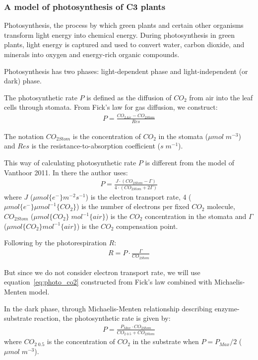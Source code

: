 \documentclass[a4paper]{article}
\begin{document}
\subsubsection{A model of photosynthesis of C3 plants}\label{sssec:photo_c3}
Photosynthesis, the process by which green plants and certain other organisms transform light energy into chemical energy. During photosynthesis in green plants, light energy is captured and used to convert water, carbon dioxide, and minerals into oxygen and energy-rich organic compounds.

Photosynthesis has two phases: light-dependent phase and light-independent (or dark) phase.

The photosynthetic rate \(P\) is defined as the diffusion of \(CO_2\) from air into the leaf cells through stomata. From Fick's law for gas diffusion, we construct:
\begin{align}
  \label{eq:photo_co2}
  P = \frac{CO_{2Air} - CO_{2Stom}}{Res}
\end{align}

The notation \(CO_{2Stom}\) is the concentration of \(CO_2\) in the stomata (\(\mu mol\;m^{-3}\)) and \(Res\) is the resistance-to-absorption coefficient (\(s\;m^{-1}\)).

This way of calculating photosynthetic rate \(P\) is different from the model of Vanthoor 2011. In there the author uses:
\begin{align}
  P = \frac{J \cdot (CO_{2Stom} - \Gamma)}{4 \cdot (CO_{2Stom} + 2\Gamma)}
\end{align}
where \(J\) (\(\mu mol \{e^-\} m^{-2} s^{-1}\)) is the electron transport rate, 4 (\(\mu mol \{e^-\} \mu mol^{-1} \{CO_2\}\)) is the
number of electrons per fixed \(CO_2\) molecule, \(CO_{2Stom}\) (\(\mu mol\{CO_2\}\;mol^{-1}\{air\}\)) is the \(CO_2\) concentration in the stomata and \(\Gamma\) (\(\mu mol \{CO_2\} mol^{-1} \{air\}\)) is the \(CO_2\) compensation point.

Following by the photorespiration \(R\):
\begin{align}
  R = P \cdot \frac{\Gamma}{CO_{2Stom}}
\end{align}

But since we do not consider electron transport rate, we will use equation~\eqref{eq:photo_co2} constructed from Fick's law combined with Michaelis-Menten model.

In the dark phase, through Michaelis-Menten relationship describing enzyme-substrate reaction, the photosynthetic rate is given by:
\begin{align}
  \label{eq:photo_dark}
  P = \frac{P_{Max} \cdot CO_{2Stom}}{CO_{2\;0.5} + CO_{2Stom}}
\end{align}
where \(CO_{2\;0.5}\) is the concentration of \(CO_2\) in the substrate when \(P = P_{Max}/2\) (\(\mu mol\;m^{-3}\)).
\end{document}
